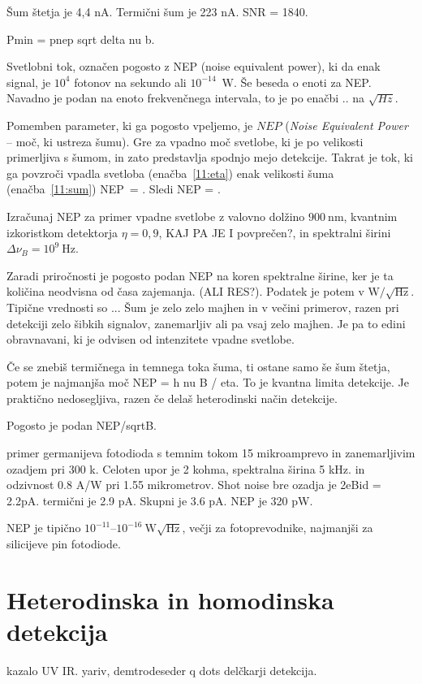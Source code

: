 Šum štetja je 4,4 nA. Termični šum je 223 nA. SNR = 1840. 

Pmin = pnep sqrt delta nu b.



Svetlobni tok, označen pogosto z NEP (noise equivalent power), ki da enak signal, je $10^4 $
fotonov na sekundo ali $10^{-14}$~W. Še beseda o enoti za NEP. Navadno je podan na enoto 
frekvenčnega intervala, to je po enačbi .. na $\sqrt{Hz}$. 


Pomemben parameter, ki ga pogosto vpeljemo, je $NEP$ ({\it Noise Equivalent Power} -- 
moč, ki ustreza šumu). Gre za vpadno moč svetlobe, ki je po velikosti primerljiva 
s šumom, in zato predstavlja spodnjo mejo detekcije. Takrat je tok, ki ga povzroči 
vpadla svetloba (enačba~\ref{11:eta}) enak velikosti šuma (enačba~\ref{11:sum})
\beq
NEP\,  \eta = .
\eeq
Sledi
\beq
NEP = .
\eeq
\begin{definition}
Izračunaj NEP za primer vpadne svetlobe z valovno dolžino $900~\si{\nano\meter}$, kvantnim
izkoristkom detektorja $\eta = 0,9$, KAJ PA JE I povprečen?, in spektralni širini 
$\Delta \nu_B=10^9~\si{\hertz}$.
\end{definition}
Zaradi priročnosti je pogosto podan NEP na koren spektralne širine, ker je ta 
količina neodvisna od časa zajemanja. (ALI RES?). Podatek je potem v 
$\si{\watt}/\sqrt{\si{\hertz}}$. Tipične vrednosti so ...
Šum je zelo zelo majhen in v večini primerov, razen pri detekciji zelo 
šibkih signalov, zanemarljiv ali pa vsaj zelo majhen. Je pa to edini obravnavani,
ki je odvisen od intenzitete vpadne svetlobe. 

Če se znebiš termičnega in temnega toka šuma, ti ostane samo še šum štetja, potem 
je najmanjša moč 
 NEP = h nu B / eta. To je kvantna limita detekcije. Je praktično nedosegljiva,
 razen če delaš heterodinski način detekcije. 


Pogosto je podan NEP/sqrtB. 

primer germanijeva fotodioda s temnim tokom 15 mikroamprevo in zanemarljivim ozadjem
 pri 300 k. Celoten upor je 2 kohma, spektralna širina 5 kHz. in odzivnost 0.8 A/W pri 1.55 mikrometrov.
 Shot noise bre ozadja je 2eBid = 2.2pA. termični je 2.9 pA. Skupni je 3.6 pA. 
 NEP je 320 pW. 
 
NEP je tipično $10^{-11}$--$10^{-16}~\si{\watt}\sqrt{\si{\hertz}}$, večji za fotoprevodnike, najmanjši
za silicijeve pin fotodiode. 


\section{Heterodinska in homodinska detekcija}

 kazalo UV IR.
 yariv, demtrodeseder
 q dots
 delčkarji detekcija.
